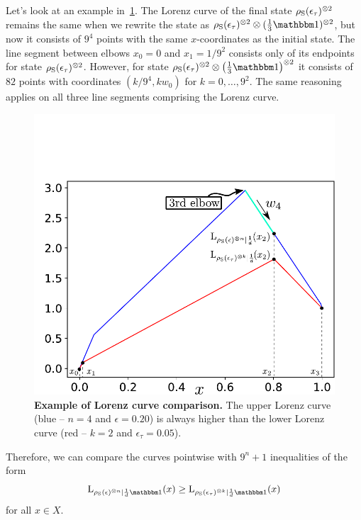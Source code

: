 \documentclass[pra,
aps,
twocolumn,
superscriptaddress,
groupedaddress,
nofootinbib,
reprint
]{revtex4-1}
\begin{document}
Let's look at an example in~\cref{fig:lc_compare}.
The Lorenz curve of the final state $\rho_{\rm{S}}(\epsilon_{\tau})^{\otimes 2}$ remains the same when we rewrite the state as $\rho_{\rm{S}}(\epsilon_{\tau})^{\otimes 2} \otimes (\tfrac{1}{3} \id)^{\otimes 2}$, but now it consists of $9^4$ points with the same $x$-coordinates as the initial state.
The line segment between elbows $x_0 = 0$ and $x_1 = 1/9^2$ consists only of its endpoints for state $\rho_{\rm{S}}(\epsilon_{\tau})^{\otimes 2}$.
However, for state $\rho_{\rm{S}}(\epsilon_{\tau})^{\otimes 2} \otimes \left( \tfrac{1}{3} \id\right)^{\otimes 2}$ it consists of $82$ points with coordinates $(k/9^4, kw_0)$ for $k=0,\dots,9^2$.
The same reasoning applies on all three line segments comprising the Lorenz curve.
\begin{figure}[t]
    \centering
    \includegraphics[scale=0.6]{figs/lc_compare.pdf}
    \caption{\textbf{Example of Lorenz curve comparison.} 
    The upper Lorenz curve (blue -- $n=4$ and $\epsilon = 0.20$) is always higher than the lower Lorenz curve (red -- $k=2$ and $\epsilon_\tau = 0.05$).
    }
    \label{fig:lc_compare}
\end{figure}
Therefore, we can compare the curves pointwise with $9^n + 1$ inequalities of the form
\begin{equation}\label{eq:lc_pointwise}
\lc{\noisysn}{\frac{1}{d}\id}(x) \geq \lc{\rho_{\rm{S}}(\epsilon_{\tau})^{\otimes k}}{\frac{1}{d}\id}(x)
\end{equation}
for all $x \in X$.
\end{document}
